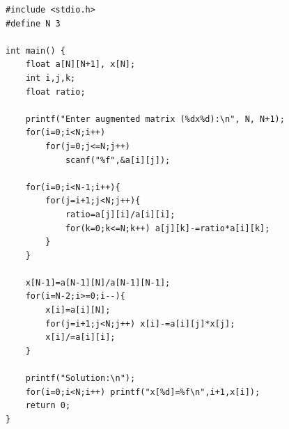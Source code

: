 \begin{verbatim}
#include <stdio.h>
#define N 3

int main() {
    float a[N][N+1], x[N];
    int i,j,k;
    float ratio;

    printf("Enter augmented matrix (%dx%d):\n", N, N+1);
    for(i=0;i<N;i++)
        for(j=0;j<=N;j++)
            scanf("%f",&a[i][j]);

    for(i=0;i<N-1;i++){
        for(j=i+1;j<N;j++){
            ratio=a[j][i]/a[i][i];
            for(k=0;k<=N;k++) a[j][k]-=ratio*a[i][k];
        }
    }

    x[N-1]=a[N-1][N]/a[N-1][N-1];
    for(i=N-2;i>=0;i--){
        x[i]=a[i][N];
        for(j=i+1;j<N;j++) x[i]-=a[i][j]*x[j];
        x[i]/=a[i][i];
    }

    printf("Solution:\n");
    for(i=0;i<N;i++) printf("x[%d]=%f\n",i+1,x[i]);
    return 0;
}

\end{verbatim}